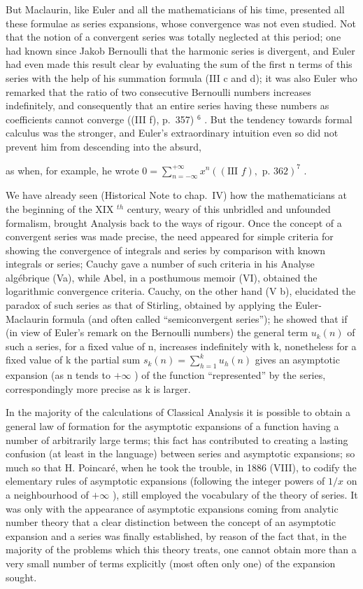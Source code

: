 But Maclaurin, like Euler and all the mathematicians of his time, presented all these formulae as series expansions, whose convergence was not even studied. Not that the notion of a convergent series was totally neglected at this period; one had known since Jakob Bernoulli that the harmonic series is divergent, and Euler had even made this result clear by evaluating the sum of the first n terms of this series with the help of his summation formula (III c and d); it was also Euler who remarked that the ratio of two consecutive Bernoulli numbers increases indefinitely, and consequently that an entire series having these numbers as coefficients cannot converge ((III f), p.~357) \(^{6}\) . But the tendency towards formal calculus was the stronger, and Euler's extraordinary intuition even so did not prevent him from descending into the absurd,

as when, for example, he wrote \(0 = \sum_{n=-\infty}^{+\infty} x^n ((\text{III } f), \text{ p. 362})^7\) .

We have already seen (Historical Note to chap.~IV) how the mathematicians at the beginning of the XIX \(^{th}\) century, weary of this unbridled and unfounded formalism, brought Analysis back to the ways of rigour. Once the concept of a convergent series was made precise, the need appeared for simple criteria for showing the convergence of integrals and series by comparison with known integrals or series; Cauchy gave a number of such criteria in his Analyse algébrique (Va), while Abel, in a posthumous memoir (VI), obtained the logarithmic convergence criteria. Cauchy, on the other hand (V b), elucidated the paradox of such series as that of Stirling, obtained by applying the Euler-Maclaurin formula (and often called ``semiconvergent series''); he showed that if (in view of Euler's remark on the Bernoulli numbers) the general term \(u_{k}(n)\) of such a series, for a fixed value of n, increases indefinitely with k, nonetheless for a fixed value of k the partial sum \(s_{k}(n) = \sum_{h=1}^{k} u_{h}(n)\) gives an asymptotic expansion (as n tends to \(+\infty\) ) of the function ``represented'' by the series, correspondingly more precise as k is larger.

In the majority of the calculations of Classical Analysis it is possible to obtain a general law of formation for the asymptotic expansions of a function having a number of arbitrarily large terms; this fact has contributed to creating a lasting confusion (at least in the language) between series and asymptotic expansions; so much so that H. Poincaré, when he took the trouble, in 1886 (VIII), to codify the elementary rules of asymptotic expansions (following the integer powers of \(1 / x\) on a neighbourhood of \(+\infty\) ), still employed the vocabulary of the theory of series. It was only with the appearance of asymptotic expansions coming from analytic number theory that a clear distinction between the concept of an asymptotic expansion and a series was finally established, by reason of the fact that, in the majority of the problems which this theory treats, one cannot obtain more than a very small number of terms explicitly (most often only one) of the expansion sought.


